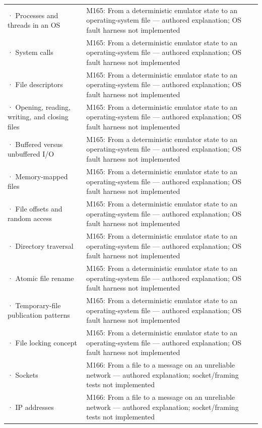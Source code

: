 {\begin{longtable}[]{@{}
  >{\raggedright\arraybackslash}p{}
  >{\raggedright\arraybackslash}p{}@{}}
2745 · Processes and threads in an OS & M165: From a deterministic emulator state to an operating-system file --- authored explanation; OS fault harness not implemented \\
2746 · System calls & M165: From a deterministic emulator state to an operating-system file --- authored explanation; OS fault harness not implemented \\
2747 · File descriptors & M165: From a deterministic emulator state to an operating-system file --- authored explanation; OS fault harness not implemented \\
2748 · Opening, reading, writing, and closing files & M165: From a deterministic emulator state to an operating-system file --- authored explanation; OS fault harness not implemented \\
2749 · Buffered versus unbuffered I/O & M165: From a deterministic emulator state to an operating-system file --- authored explanation; OS fault harness not implemented \\
2750 · Memory-mapped files & M165: From a deterministic emulator state to an operating-system file --- authored explanation; OS fault harness not implemented \\
2751 · File offsets and random access & M165: From a deterministic emulator state to an operating-system file --- authored explanation; OS fault harness not implemented \\
2752 · Directory traversal & M165: From a deterministic emulator state to an operating-system file --- authored explanation; OS fault harness not implemented \\
2753 · Atomic file rename & M165: From a deterministic emulator state to an operating-system file --- authored explanation; OS fault harness not implemented \\
2754 · Temporary-file publication patterns & M165: From a deterministic emulator state to an operating-system file --- authored explanation; OS fault harness not implemented \\
2755 · File locking concept & M165: From a deterministic emulator state to an operating-system file --- authored explanation; OS fault harness not implemented \\
2756 · Sockets & M166: From a file to a message on an unreliable network --- authored explanation; socket/framing tests not implemented \\
2757 · IP addresses & M166: From a file to a message on an unreliable network --- authored explanation; socket/framing tests not implemented \\

\end{longtable}}
